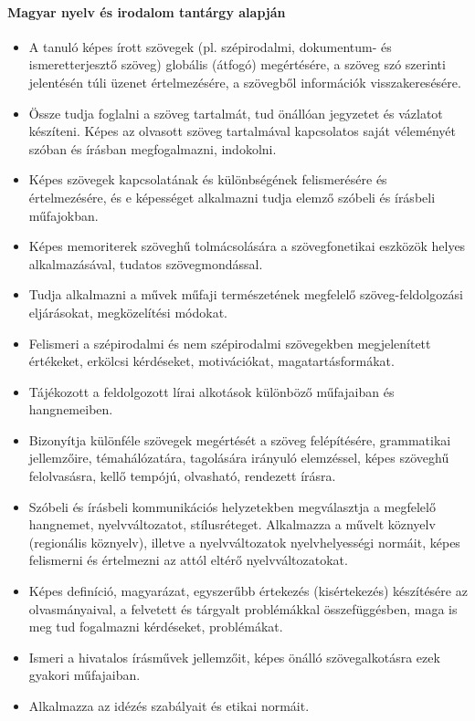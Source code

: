 \paragraph{Magyar nyelv és irodalom tantárgy alapján}
\begin{itemize}
\item A tanuló képes írott szövegek (pl. szépirodalmi, dokumentum- és ismeretterjesztő szöveg) globális (átfogó) megértésére, a szöveg szó szerinti jelentésén túli üzenet értelmezésére, a szövegből információk visszakeresésére.
\item Össze tudja foglalni a szöveg tartalmát, tud önállóan jegyzetet és vázlatot készíteni. Képes az olvasott szöveg tartalmával kapcsolatos saját véleményét szóban és írásban megfogalmazni, indokolni.
\item Képes szövegek kapcsolatának és különbségének felismerésére és értelmezésére, és e képességet alkalmazni tudja elemző szóbeli és írásbeli műfajokban.
\item Képes memoriterek szöveghű tolmácsolására a szövegfonetikai eszközök helyes alkalmazásával, tudatos szövegmondással.
\item Tudja alkalmazni a művek műfaji természetének megfelelő szöveg-feldolgozási eljárásokat, megközelítési módokat.
\item Felismeri a szépirodalmi és nem szépirodalmi szövegekben megjelenített értékeket, erkölcsi kérdéseket, motivációkat, magatartásformákat.
\item Tájékozott a feldolgozott lírai alkotások különböző műfajaiban és hangnemeiben.
\item Bizonyítja különféle szövegek megértését a szöveg felépítésére, grammatikai jellemzőire, témahálózatára, tagolására irányuló elemzéssel, képes szöveghű felolvasásra, kellő tempójú, olvasható, rendezett írásra.
\item Szóbeli és írásbeli kommunikációs helyzetekben megválasztja a megfelelő hangnemet, nyelvváltozatot, stílusréteget. Alkalmazza a művelt köznyelv (regionális köznyelv), illetve a nyelvváltozatok nyelvhelyességi normáit, képes felismerni és értelmezni az attól eltérő nyelvváltozatokat.
\item Képes definíció, magyarázat, egyszerűbb értekezés (kisértekezés) készítésére az olvasmányaival, a felvetett és tárgyalt problémákkal összefüggésben, maga is meg tud fogalmazni kérdéseket, problémákat.
\item Ismeri a hivatalos írásművek jellemzőit, képes önálló szövegalkotásra ezek gyakori műfajaiban.
\item Alkalmazza az idézés szabályait és etikai normáit.

\end{itemize}
